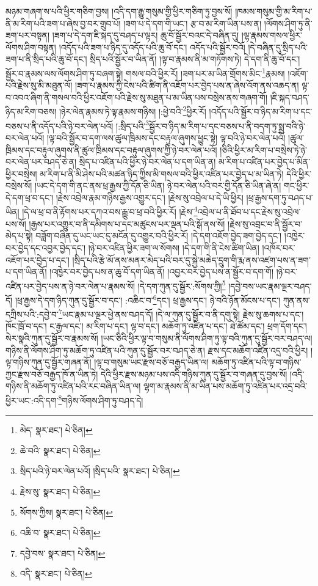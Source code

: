 མཉམ་གཞག་ས་པའི་ཕྱིར་གཅིག་བྱས། །འདི་དག་རྒྱུ་གསུམ་གྱི་ཕྱིར་གཅིག་ཏུ་བྱས་སོ། །ཁམས་གསུམ་གྱི་མ་རིག་པ་ནི་མ་རིག་པའི་ཟག་པ་ཞེས་བྱ་བར་གྲུབ་པོ། །ཟག་པ་དེ་དག་གི་ཡང་། རྩ་བ་མ་རིག་ཡིན་པས་ན། །ལོགས་ཤིག་ཏུ་ནི་ཟག་པར་བསྟན། །ཟག་པ་དེ་དག་ཇི་སྐད་དུ་བཤད་པ་ལྟར། ཆུ་བོ་སྦྱོར་བའང་དེ་བཞིན་དུ། །ལྷ་རྣམས་གསལ་ཕྱིར་ལོགས་ཤིག་བསྟན། །འདོད་པའི་ཟག་པ་ཉིད་དུ་འདོད་པའི་ཆུ་བོ་དང་། འདོད་པའི་སྦྱོར་བའོ། །དེ་བཞིན་དུ་སྲིད་པའི་ཟག་པ་ནི་སྲིད་པའི་ཆུ་བོ་དང་། སྲིད་པའི་སྦྱོར་བ་ཡིན་ནོ། །ལྟ་བ་རྣམས་ནི་མ་གཏོགས་ཏེ། དེ་དག་ནི་ཆུ་བོ་དང་། སྦྱོར་བ་རྣམས་ལས་ལོགས་ཤིག་ཏུ་བཞག་སྟེ། གསལ་བའི་ཕྱིར་རོ། །ཟག་པར་མ་ཡིན་གྲོགས་མིང་\footnote{མེད་  སྣར་ཐང་།  པེ་ཅིན། }རྣམས། །འཇོག་པའི་རྗེས་སུ་མི་མཐུན་ལོ། །ཟག་པ་རྣམས་ཀྱི་ངེས་པའི་ཚིག་ནི་འཇོག་པར་བྱེད་པས་ན་ཞེས་འོག་ནས་འཆད་ན། ལྟ་བ་འབའ་ཞིག་ནི་གསལ་བའི་ཕྱིར་འཇོག་པའི་རྗེས་སུ་མཐུན་པ་མ་ཡིན་པས་བསྲེས་ནས་གཞག་གོ། །ཇི་སྐད་བཤད་ཉིད་མ་རིག་བཅས། །ཉེར་ལེན་རྣམས་ཏེ་ལྟ་རྣམས་གཉིས། །:ཕྱེ་བའི་\footnote{ཆེ་བའི་  སྣར་ཐང་།  པེ་ཅིན། }ཕྱིར་རོ། །འདོད་པའི་སྦྱོར་བ་ཉིད་མ་རིག་པ་དང་བཅས་པ་ནི་འདོད་པའི་ཉེ་བར་ལེན་པའོ། །:སྲིད་པའི་\footnote{སྲིད་པའི་ཉེ་བར་ལེན་པའོ། །སྲིད་པའི་  སྣར་ཐང་།  པེ་ཅིན། }སྦྱོར་བ་ཉིད་མ་རིག་པ་དང་བཅས་པ་ནི་བདག་ཏུ་སྨྲ་བའི་ཉེ་བར་ལེན་པའོ། །ལྟ་བའི་སྦྱོར་བ་དག་ལས་ཚུལ་ཁྲིམས་དང་བརྟུལ་ཞུགས་ཕྱུང་སྟེ། ལྟ་བའི་ཉེ་བར་ལེན་པའོ། །ཚུལ་ཁྲིམས་དང་བརྟུལ་ཞུགས་ནི་ཚུལ་ཁྲིམས་དང་བརྟུལ་ཞུགས་ཀྱི་ཉེ་བར་ལེན་པའོ། །ཅིའི་ཕྱིར་མ་རིག་པ་བསྲེས་ཏེ་ཉེ་བར་ལེན་པར་བཤད་ཅེ་ན། སྲིད་པ་འཛིན་པའི་ཕྱིར་ཉེ་བར་ལེན་པ་དག་ཡིན་ན། མ་རིག་པ་འཛིན་པར་བྱེད་པ་མིན་ཕྱིར་བསྲེས། མ་རིག་པ་ནི་མི་ཤེས་པའི་མཚན་ཉིད་ཀྱིས་མི་གསལ་བའི་ཕྱིར་འཛིན་པར་བྱེད་པ་མ་ཡིན་ཏེ། དེའི་ཕྱིར་བསྲེས་སོ། །ཡང་དེ་དག་གི་ནང་ནས་ཕྲ་རྒྱས་ཀྱི་དོན་ཅི་ཡིན། ཉེ་བར་ལེན་པའི་བར་གྱི་དོན་ཅི་ཡིན་ཞེ་ན། གང་ཕྱིར་དེ་དག་ཕྲ་བ་དང་། །རྗེས་འབྲེལ་རྣམ་གཉིས་རྒྱས་འགྱུར་དང་། །རྗེས་སུ་འབྲེལ་པ་དེ་ཡི་ཕྱིར། །ཕྲ་རྒྱས་དག་ཏུ་བཤད་པ་ཡིན། །དེ་ལ་ཕྲ་བ་ནི་རྟོགས་པར་དཀའ་བས་རྒྱུ་བ་ཕྲ་བའི་ཕྱིར་རོ། །རྗེས་\footnote{རྗེས་སུ་  སྣར་ཐང་།  པེ་ཅིན། }འབྲེལ་པ་ནི་ཐོབ་པ་དང་རྗེས་སུ་འབྲེལ་པས་སོ། །རྒྱས་པར་འགྱུར་བ་ནི་དམིགས་པ་དང་མཚུངས་པར་ལྡན་པའི་སྒོ་ནས་སོ། །རྗེས་སུ་འབྲང་བ་ནི་སྦྱོར་བ་མེད་པ་སྟེ། བཟློག་བཞིན་དུ་ཡང་ཡང་དུ་མངོན་དུ་འགྱུར་བའི་ཕྱིར་རོ། །དེ་དག་འཇོག་བྱེད་ཟག་བྱེད་དང་། །འཁྱེར་བར་བྱེད་དང་འབྱར་བྱེད་དང་། །ཉེ་བར་འཛིན་ཕྱིར་ཟག་ལ་སོགས། །དེ་དག་གི་ནི་ངེས་ཚིག་ཡིན། །འཁོར་བར་འཇོག་པར་བྱེད་པ་དང་། །སྲིད་པའི་རྩེ་མོ་ནས་མནར་མེད་པའི་བར་དུ་སྐྱེ་མཆེད་དྲུག་གི་རྨ་ནས་འཛག་པས་ན་ཟག་པ་དག་ཡིན་ནོ། །འཁྱེར་བར་བྱེད་པས་ན་ཆུ་བོ་དག་ཡིན་ནོ། །འབྱར་བར་བྱེད་པས་ན་སྦྱོར་བ་དག་གོ། །ཉེ་བར་འཛིན་པར་བྱེད་པས་ན་ཉེ་བར་ལེན་པ་རྣམས་སོ། །དེ་དག་ཀུན་དུ་སྦྱོར་:སོགས་ཀྱི།\footnote{སོགས་ཀྱིས།  སྣར་ཐང་།  པེ་ཅིན། } །དབྱེ་བས་ཡང་རྣམ་ལྔར་བཤད་དོ། །ཕྲ་རྒྱས་དེ་དག་ཉིད་ཀུན་དུ་སྦྱོར་བ་དང་། :འཆིང་བ་\footnote{འཆི་བ་  སྣར་ཐང་།  པེ་ཅིན། }དང་། ཕྲ་རྒྱས་དང་། ཉེ་བའི་ཉོན་མོངས་པ་དང་། ཀུན་ནས་དཀྲིས་པའི་:དབྱེ་བ་\footnote{དབྱེ་བས་  སྣར་ཐང་།  པེ་ཅིན། }ཡང་རྣམ་པ་ལྔར་ཕྱེ་ནས་བཤད་དོ། །དེ་ལ་ཀུན་དུ་སྦྱོར་བ་ནི་དགུ་སྟེ། རྗེས་སུ་ཆགས་པ་དང་། ཁོང་ཁྲོ་བ་དང་། ང་རྒྱལ་དང་། མ་རིག་པ་དང་། ལྟ་བ་དང་། མཆོག་ཏུ་འཛིན་པ་དང་། ཐེ་ཚོམ་དང་། ཕྲག་དོག་དང་། སེར་སྣའི་ཀུན་དུ་སྦྱོར་བ་རྣམས་སོ། །ཡང་ཅིའི་ཕྱིར་ལྟ་བ་གསུམ་ནི་ལོགས་ཤིག་ཏུ་ལྟ་བའི་ཀུན་དུ་སྦྱོར་བར་བཤད་ལ། གཉིས་ནི་ལོགས་ཤིག་ཏུ་མཆོག་ཏུ་འཛིན་པའི་ཀུན་དུ་སྦྱོར་བར་བཤད་ཅེ་ན། རྫས་དང་མཆོག་འཛིན་འདྲ་བའི་ཕྱིར། །ལྟ་གཉིས་ཀུན་དུ་སྦྱོར་གཞན་ནོ། །ལྟ་བ་གསུམ་ཡང་རྫས་བཅོ་བརྒྱད་ཡིན་ལ། མཆོག་ཏུ་འཛིན་པའི་ལྟ་བ་གཉིས་ཀྱང་རྫས་བཅོ་བརྒྱད་ཁོ་ན་ཡིན་ཏེ། དེའི་ཕྱིར་རྫས་མཉམ་པས་འདི་གཉིས་ཀུན་དུ་སྦྱོར་བ་གཞན་དུ་བྱས་སོ། །འདི་གཉིས་ནི་མཆོག་ཏུ་འཛིན་པའི་རང་བཞིན་ཡིན་ལ། ལྷག་མ་རྣམས་ནི་མ་ཡིན་པས་མཆོག་ཏུ་འཛིན་པར་འདྲ་བའི་ཕྱིར་ཡང་:འདི་དག་\footnote{འདི་  སྣར་ཐང་།  པེ་ཅིན། }གཉིས་ལོགས་ཤིག་ཏུ་བཤད་དེ། 